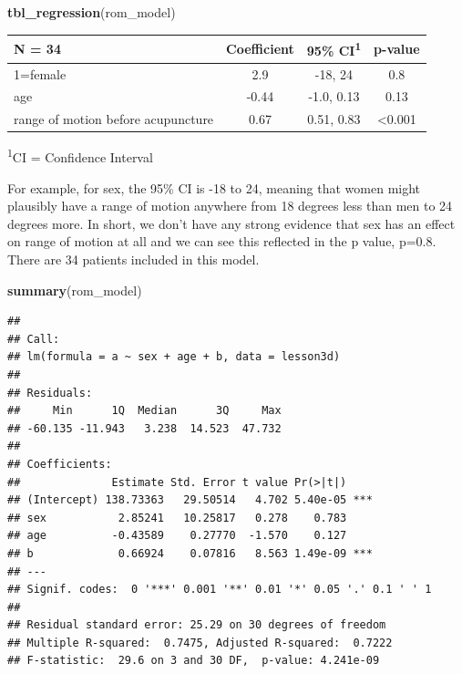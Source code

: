 \documentclass[]{book}
\newenvironment{Shaded}{\begin{snugshade}}{\end{snugshade}}
\newcommand{\KeywordTok}[1]{\textcolor[rgb]{0.13,0.29,0.53}{\textbf{#1}}}
\newcommand{\NormalTok}[1]{#1}
\begin{document}
\begin{Shaded}
\begin{Highlighting}[]
\KeywordTok{tbl_regression}\NormalTok{(rom_model)}
\end{Highlighting}
\end{Shaded}

\captionsetup[table]{labelformat=empty,skip=1pt}
\begin{longtable}{lccc}
\toprule
\textbf{N = 34} & \textbf{Coefficient} & \textbf{95\% CI}\textsuperscript{1} & \textbf{p-value} \\ 
\midrule
1=female & 2.9 & -18, 24 & 0.8 \\ 
age & -0.44 & -1.0, 0.13 & 0.13 \\ 
range of motion before acupuncture & 0.67 & 0.51, 0.83 & <0.001 \\ 
\bottomrule
\end{longtable}
\vspace{-5mm}
\begin{minipage}{\linewidth}
\textsuperscript{1}CI = Confidence Interval \\ 
\end{minipage}

For example, for sex, the 95\% CI is -18 to 24, meaning that women might
plausibly have a range of motion anywhere from 18 degrees less than men
to 24 degrees more. In short, we don't have any strong evidence that sex
has an effect on range of motion at all and we can see this reflected in
the p value, p=0.8. There are 34 patients included in this model.

\begin{Shaded}
\begin{Highlighting}[]
\KeywordTok{summary}\NormalTok{(rom_model)}
\end{Highlighting}
\end{Shaded}

\begin{verbatim}
## 
## Call:
## lm(formula = a ~ sex + age + b, data = lesson3d)
## 
## Residuals:
##     Min      1Q  Median      3Q     Max 
## -60.135 -11.943   3.238  14.523  47.732 
## 
## Coefficients:
##              Estimate Std. Error t value Pr(>|t|)    
## (Intercept) 138.73363   29.50514   4.702 5.40e-05 ***
## sex           2.85241   10.25817   0.278    0.783    
## age          -0.43589    0.27770  -1.570    0.127    
## b             0.66924    0.07816   8.563 1.49e-09 ***
## ---
## Signif. codes:  0 '***' 0.001 '**' 0.01 '*' 0.05 '.' 0.1 ' ' 1
## 
## Residual standard error: 25.29 on 30 degrees of freedom
## Multiple R-squared:  0.7475, Adjusted R-squared:  0.7222 
## F-statistic:  29.6 on 3 and 30 DF,  p-value: 4.241e-09
\end{verbatim}
\end{document}
